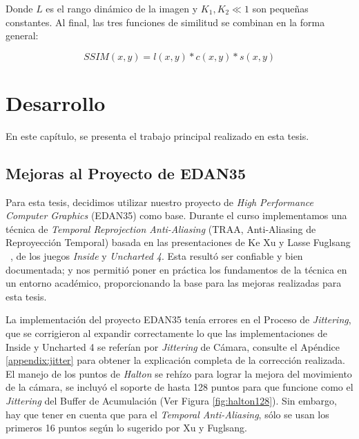 \documentclass[pregrado]{tesis-usb} %
\begin{document}
Donde $L$ es el rango dinámico de la imagen y $K_1, K_2 \ll1$ son pequeñas constantes. Al final, las tres funciones de similitud se combinan en la forma general:

\begin{equation}\label{eq:ssim}
SSIM(x,y)=l(x,y)*c(x,y)*s(x,y)
\end{equation}



\chapter{Desarrollo}
En este capítulo, se presenta el trabajo principal realizado en esta tesis.
\section{Mejoras al Proyecto de EDAN35}
Para esta tesis, decidimos utilizar nuestro proyecto de \textit{High Performance Computer Graphics} (EDAN35) como base. Durante el curso implementamos una técnica de \textit{Temporal Reprojection Anti-Aliasing} (TRAA, Anti-Aliasing de Reproyección Temporal) basada en las presentaciones de Ke Xu y Lasse Fuglsang ~\cite{XU2016, Fuglsand2016}, de los juegos \textit{Inside} y \textit{Uncharted 4}. Esta resultó ser confiable y bien documentada; y nos permitió poner en práctica los fundamentos de la técnica en un entorno académico, proporcionando la base para las mejoras realizadas para esta tesis.

La implementación del proyecto EDAN35 tenía errores en el Proceso de \textit{Jittering}, que se corrigieron al expandir correctamente lo que las implementaciones de Inside y Uncharted 4  se referían por \textit{Jittering} de Cámara, consulte el Apéndice \ref{appendix:jitter} para obtener la explicación completa de la corrección realizada. El manejo de los puntos de \textit{Halton} se rehízo para lograr la mejora del movimiento de la cámara, se incluyó el soporte de hasta 128 puntos para que funcione como el \textit{Jittering} del Buffer de Acumulación (Ver Figura \ref{fig:halton128}). Sin embargo, hay que tener en cuenta que para el \textit{Temporal Anti-Aliasing}, sólo se usan los primeros 16 puntos según lo sugerido por Xu y Fuglsang. ~\cite{XU2016, Fuglsand2016}
\end{document}
